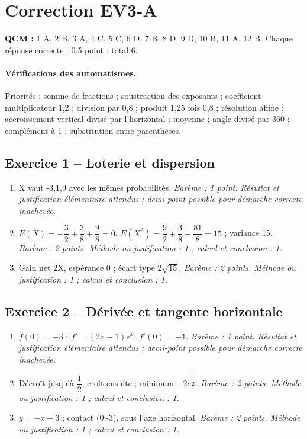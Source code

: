 \clearpage\section*{Correction EV3-A}\label{EV3-A-CORR}
\textbf{QCM :} 1 A, 2 B, 3 A, 4 C, 5 C, 6 D, 7 B, 8 D, 9 D, 10 B, 11 A, 12 B. Chaque réponse correcte : 0,5 point ; total 6.
\paragraph{Vérifications des automatismes.} Priorités ; somme de fractions ; soustraction des exposants ; coefficient multiplicateur 1,2 ; division par 0,8 ; produit 1,25 fois 0,8 ; résolution affine ; accroissement vertical divisé par l’horizontal ; moyenne ; angle divisé par 360 ; complément à 1 ; substitution entre parenthèses.
\subsection*{Exercice 1 -- Loterie et dispersion}
\begin{enumerate}
\item X vaut -3,1,9 avec les mêmes probabilités. \textit{Barème : 1 point. Résultat et justification élémentaire attendus ; demi-point possible pour démarche correcte inachevée.}
\item $E(X)=-\dfrac{3}{2}+\dfrac{3}{8}+\dfrac{9}{8}=0$. $E(X^2)=\dfrac{9}{2}+\dfrac{3}{8}+\dfrac{81}{8}=15$ ; variance 15. \textit{Barème : 2 points. Méthode ou justification : 1 ; calcul et conclusion : 1.}
\item Gain net 2X, espérance 0 ; écart type $2\sqrt{15}$. \textit{Barème : 2 points. Méthode ou justification : 1 ; calcul et conclusion : 1.}
\end{enumerate}
\subsection*{Exercice 2 -- Dérivée et tangente horizontale}
\begin{enumerate}
\item $f(0)=-3$ ; $f\prime=(2x-1)e^x$, $f\prime(0)=-1$. \textit{Barème : 1 point. Résultat et justification élémentaire attendus ; demi-point possible pour démarche correcte inachevée.}
\item Décroît jusqu’à $\dfrac{1}{2}$, croît ensuite ; minimum $-2e^{\dfrac{1}{2}}$. \textit{Barème : 2 points. Méthode ou justification : 1 ; calcul et conclusion : 1.}
\item $y=-x-3$ ; contact (0;-3), sous l’axe horizontal. \textit{Barème : 2 points. Méthode ou justification : 1 ; calcul et conclusion : 1.}
\end{enumerate}
